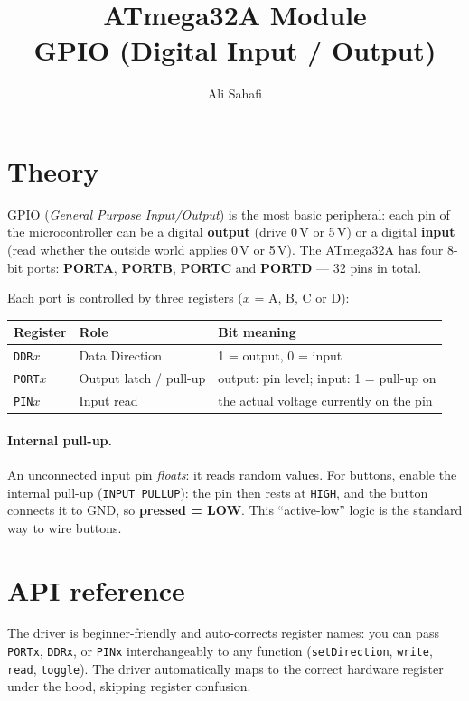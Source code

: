 \documentclass[11pt,a4paper]{article}
\title{ATmega32A Module \\ \Large GPIO (Digital Input / Output)}
\author{Ali Sahafi}
\date{}
\begin{document}
\maketitle

\section{Theory}

GPIO (\emph{General Purpose Input/Output}) is the most basic peripheral: each
pin of the microcontroller can be a digital \textbf{output} (drive 0\,V or
5\,V) or a digital \textbf{input} (read whether the outside world applies
0\,V or 5\,V). The ATmega32A has four 8-bit ports: \textbf{PORTA},
\textbf{PORTB}, \textbf{PORTC} and \textbf{PORTD} --- 32 pins in total.

Each port is controlled by three registers ($x$ = A, B, C or D):

\begin{center}
\begin{tabular}{lll}
\toprule
\textbf{Register} & \textbf{Role} & \textbf{Bit meaning} \\
\midrule
\texttt{DDR$x$}  & Data Direction & 1 = output, 0 = input \\
\texttt{PORT$x$} & Output latch / pull-up & output: pin level; input: 1 = pull-up on \\
\texttt{PIN$x$}  & Input read & the actual voltage currently on the pin \\
\bottomrule
\end{tabular}
\end{center}

\paragraph{Internal pull-up.} An unconnected input pin \emph{floats}: it reads
random values. For buttons, enable the internal pull-up
(\texttt{INPUT\_PULLUP}): the pin then rests at \texttt{HIGH}, and the button
connects it to GND, so \textbf{pressed = LOW}. This ``active-low'' logic is
the standard way to wire buttons.

\section{API reference}

The driver is beginner-friendly and auto-corrects register names: you can pass
\texttt{PORTx}, \texttt{DDRx}, or \texttt{PINx} interchangeably to any function
(\texttt{setDirection}, \texttt{write}, \texttt{read}, \texttt{toggle}). The driver
automatically maps to the correct hardware register under the hood, skipping register
confusion.
\end{document}

